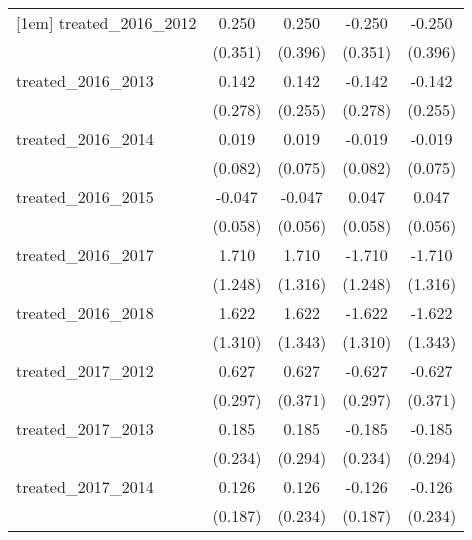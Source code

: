 {\begin{tabular}{l*{4}{c}}
[1em]
treated\_2016\_2012&       0.250         &       0.250         &      -0.250         &      -0.250         \\
            &     (0.351)         &     (0.396)         &     (0.351)         &     (0.396)         \\
[1em]
treated\_2016\_2013&       0.142         &       0.142         &      -0.142         &      -0.142         \\
            &     (0.278)         &     (0.255)         &     (0.278)         &     (0.255)         \\
[1em]
treated\_2016\_2014&       0.019         &       0.019         &      -0.019         &      -0.019         \\
            &     (0.082)         &     (0.075)         &     (0.082)         &     (0.075)         \\
[1em]
treated\_2016\_2015&      -0.047         &      -0.047         &       0.047         &       0.047         \\
            &     (0.058)         &     (0.056)         &     (0.058)         &     (0.056)         \\
[1em]
treated\_2016\_2017&       1.710         &       1.710         &      -1.710         &      -1.710         \\
            &     (1.248)         &     (1.316)         &     (1.248)         &     (1.316)         \\
[1em]
treated\_2016\_2018&       1.622         &       1.622         &      -1.622         &      -1.622         \\
            &     (1.310)         &     (1.343)         &     (1.310)         &     (1.343)         \\
[1em]
treated\_2017\_2012&       0.627\sym{*}  &       0.627         &      -0.627\sym{*}  &      -0.627         \\
            &     (0.297)         &     (0.371)         &     (0.297)         &     (0.371)         \\
[1em]
treated\_2017\_2013&       0.185         &       0.185         &      -0.185         &      -0.185         \\
            &     (0.234)         &     (0.294)         &     (0.234)         &     (0.294)         \\
[1em]
treated\_2017\_2014&       0.126         &       0.126         &      -0.126         &      -0.126         \\
            &     (0.187)         &     (0.234)         &     (0.187)         &     (0.234)         \\

\end{tabular}}
